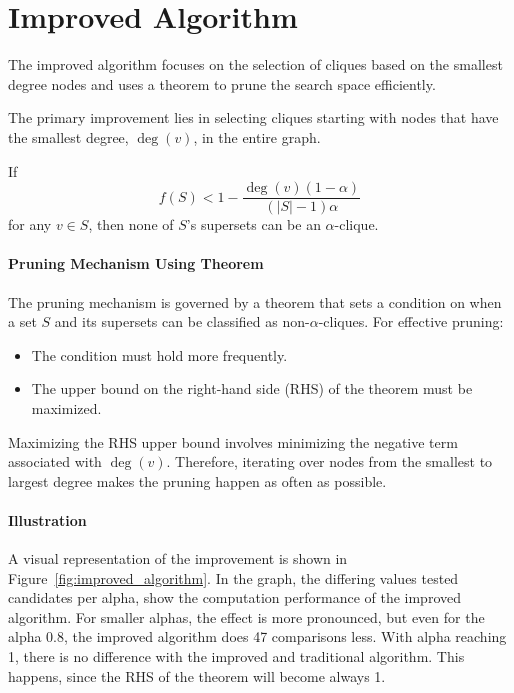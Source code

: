 \section{Improved Algorithm}

The improved algorithm focuses on the selection of cliques based on the smallest degree nodes and uses a theorem to prune the search space efficiently.

The primary improvement lies in selecting cliques starting with nodes that have the smallest degree, \( \deg(v) \), in the entire graph.

\begin{theorem}
    If
    \[
        f(S) < 1 - \frac{\deg(v) (1 - \alpha)}{(|S| - 1) \alpha}
    \]
    for any \( v \in S \), then none of \( S \)'s supersets can be an \( \alpha \)-clique.
\end{theorem}

\paragraph{Pruning Mechanism Using Theorem}
The pruning mechanism is governed by a theorem that sets a condition on when a set \( S \) and its supersets can be classified as non-\( \alpha \)-cliques. For effective pruning:
\begin{itemize}
    \item The condition must hold more frequently.
    \item The upper bound on the right-hand side (RHS) of the theorem must be maximized.
\end{itemize}
Maximizing the RHS upper bound involves minimizing the negative term associated with \( \deg(v) \). Therefore, iterating over nodes from the smallest to largest degree makes the pruning happen as often as possible.

\paragraph{Illustration}
A visual representation of the improvement is shown in Figure~\ref{fig:improved_algorithm}. In the graph, the differing values tested candidates per alpha, show the computation performance of the improved algorithm. For smaller alphas, the effect is more pronounced, but even for the alpha 0.8, the improved algorithm does 47 comparisons less. With alpha reaching 1, there is no difference with the improved and traditional algorithm. This happens, since the RHS of the theorem will become always 1.

